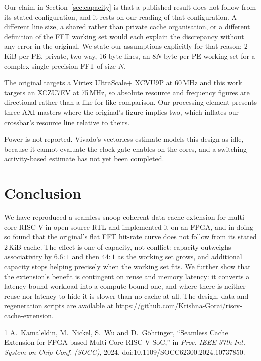 \documentclass[conference]{IEEEtran}
\begin{document}
Our claim in Section~\ref{sec:capacity} is that a published result does not
follow from its stated configuration, and it rests on our reading of that
configuration. A different line size, a shared rather than private cache
organisation, or a different definition of the FFT working set would each
explain the discrepancy without any error in the original. We state our
assumptions explicitly for that reason: 2\,KiB per PE, private, two-way, 16-byte
lines, an $8N$-byte per-PE working set for a complex single-precision FFT of
size $N$.

The original targets a Virtex UltraScale+ XCVU9P at 60\,MHz and this work
targets an XCZU7EV at 75\,MHz, so absolute resource and frequency figures are
directional rather than a like-for-like comparison. Our processing element
presents three AXI masters where the original's figure implies two, which
inflates our crossbar's resource line relative to theirs.

Power is not reported. Vivado's vectorless estimate models this design as idle,
because it cannot evaluate the clock-gate enables on the cores, and a
switching-activity-based estimate has not yet been completed.

\section{Conclusion}

We have reproduced a seamless snoop-coherent data-cache extension for multi-core
RISC-V in open-source RTL and implemented it on an FPGA, and in doing so found
that the original's flat FFT hit-rate curve does not follow from its stated
2\,KiB cache. The effect is one of capacity, not conflict: capacity outweighs
associativity by $6.6{:}1$ and then $44{:}1$ as the working set grows, and
additional capacity stops helping precisely when the working set fits. We further show that the extension's benefit is contingent on reuse and memory
latency: it converts a latency-bound workload into a compute-bound one, and
where there is neither reuse nor latency to hide it is slower than no cache at
all. The design, data and regeneration scripts are available at
\url{https://github.com/Krishna-Gorai/riscv-cache-extension}.

\begin{thebibliography}{1}
A.~Kamaleldin, M.~Nickel, S.~Wu and D.~G\"ohringer,
``Seamless Cache Extension for FPGA-based Multi-Core RISC-V SoC,''
in \emph{Proc. IEEE 37th Int. System-on-Chip Conf. (SOCC)}, 2024,
doi:10.1109/SOCC62300.2024.10737850.
\end{thebibliography}
\end{document}
